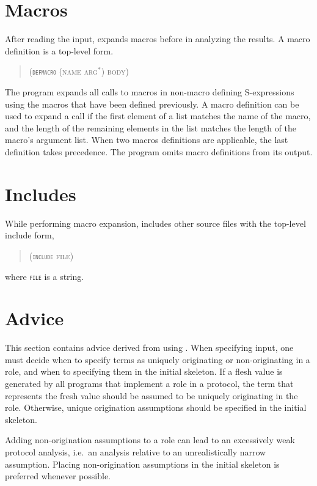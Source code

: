 \documentclass[12pt]{article}
\begin{document}
\section{Macros}\label{sec:macros}

After reading the input, {\cpsa} expands macros before in analyzing
the results. A macro definition is a top-level form.

\begin{quote}\scshape
(\texttt{\textup{defmacro}} (name arg${}^\ast$) body)
\end{quote}

The {\cpsa} program expands all calls to macros in non-macro defining
S-expressions using the macros that have been defined previously. A
macro definition can be used to expand a call if the first element of
a list matches the name of the macro, and the length of the remaining
elements in the list matches the length of the macro's argument
list. When two macros definitions are applicable, the last definition
takes precedence. The {\cpsa} program omits macro definitions from its
output.

\section{Includes}\label{sec:include}

While performing macro expansion, {\cpsa} includes other source files
with the top-level include form,
\begin{quote}\scshape
(\texttt{\textup{include}} file)
\end{quote}
where \texttt{\scshape file} is a string.

\section{Advice}\label{sec:advice}

This section contains advice derived from using {\cpsa}.  When
specifying {\cpsa} input, one must decide when to specify terms as
uniquely originating or non-originating in a role, and when to
specifying them in the initial skeleton.  If a flesh value is
generated by all programs that implement a role in a protocol, the
term that represents the fresh value should be assumed to be uniquely
originating in the role.  Otherwise, unique origination assumptions
should be specified in the initial skeleton.

Adding non-origination assumptions to a role can lead to an
excessively weak protocol analysis, i.e.\ an analysis relative to an
unrealistically narrow assumption.  Placing non-origination
assumptions in the initial skeleton is preferred whenever possible.
\end{document}
